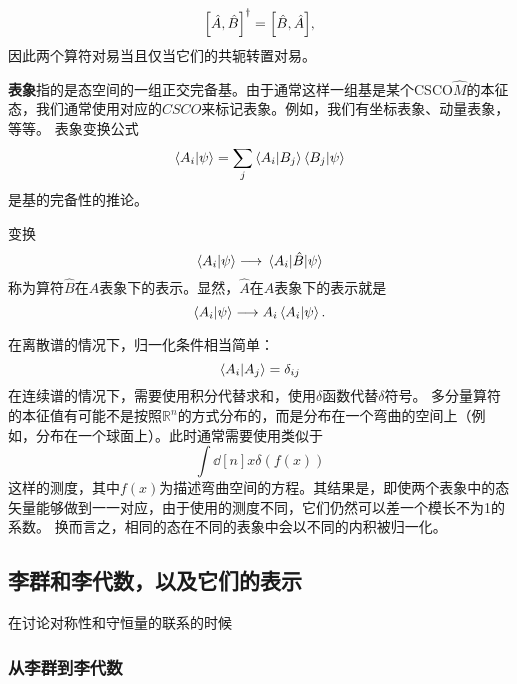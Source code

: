 \documentclass[hyperref, UTF8, a4paper]{ctexart}
\newcommand*{\reals}{\mathbb{R}}
\begin{document}
\[
    \comm{\hat{A}}{\hat{B}}^\dagger = \comm{\hat{B}}{\hat{A}},
\]
因此两个算符对易当且仅当它们的共轭转置对易。


\textbf{表象}指的是态空间的一组正交完备基。由于通常这样一组基是某个CSCO$\hat{M}$的本征态，我们通常使用对应的$CSCO$来标记表象。例如，我们有坐标表象、动量表象，等等。
表象变换公式
\begin{equation}
    \braket{A_i}{\psi} = \sum_j \braket{A_i}{B_j} \braket{B_j}{\psi}
\end{equation}
是基的完备性的推论。

变换
\[
    \braket{A_i}{\psi} \longrightarrow \mel{A_i}{\hat{B}}{\psi}
\]
称为算符$\hat{B}$在$A$表象下的表示。显然，$\hat{A}$在$A$表象下的表示就是
\[
    \braket{A_i}{\psi} \longrightarrow A_i \braket{A_i}{\psi}.
\]

在离散谱的情况下，归一化条件相当简单：
\[
    \braket{A_i}{A_j} = \delta_{ij}
\]
在连续谱的情况下，需要使用积分代替求和，使用$\delta$函数代替$\delta$符号。
多分量算符的本征值有可能不是按照$\reals^n$的方式分布的，而是分布在一个弯曲的空间上（例如，分布在一个球面上）。此时通常需要使用类似于
\[
    \int \dd[n]{x} \delta(f(x))
\]
这样的测度，其中$f(x)$为描述弯曲空间的方程。其结果是，即使两个表象中的态矢量能够做到一一对应，由于使用的测度不同，它们仍然可以差一个模长不为1的系数。
换而言之，相同的态在不同的表象中会以不同的内积被归一化。

\subsection{李群和李代数，以及它们的表示}
在讨论对称性和守恒量的联系的时候

\subsubsection{从李群到李代数}
\end{document}
